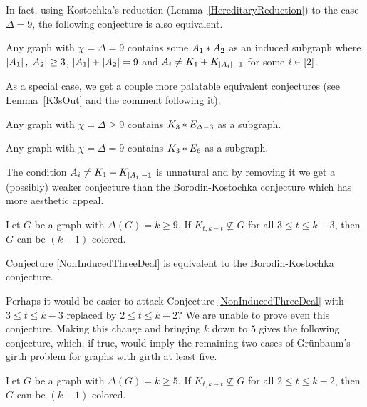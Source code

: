In fact, using Kostochka's reduction (Lemma~\ref{HereditaryReduction}) to the
case $\Delta = 9$, the following conjecture is also equivalent.

\begin{conjecture}
Any graph with $\chi = \Delta = 9$ contains some $A_1 \mbox{\hspace{2 pt}$\ast$\hspace{2 pt}} A_2$ as an induced
subgraph where $\left|A_1\right|, \left|A_2\right| \geq 3$, $\left|A_1\right| + \left|A_2\right| = 9$
and $A_i \neq K_1 \mbox{\hspace{2 pt}$+$\hspace{2 pt}} K_{\left|A_i\right| - 1}$ for some $i \in \left[2\right]$.
\end{conjecture}

As a special case, we get a couple more palatable equivalent conjectures (see
Lemma~\ref{K3sOut} and the comment following it).

\begin{conjecture}\label{K3Conjecture}
Any graph with $\chi = \Delta \geq 9$ contains $K_3 \mbox{\hspace{2 pt}$\ast$\hspace{2 pt}} E_{\Delta-3}$ as a
subgraph.
\end{conjecture}

\begin{conjecture}\label{K3ConjectureReduced}
Any graph with $\chi = \Delta = 9$ contains $K_3 \mbox{\hspace{2 pt}$\ast$\hspace{2 pt}} E_6$ as a
subgraph.
\end{conjecture}

The condition $A_i \neq K_1 \mbox{\hspace{2 pt}$+$\hspace{2 pt}} K_{\left|A_i\right| - 1}$ is unnatural and
by removing it we get a (possibly) weaker conjecture than the
Borodin-Kostochka conjecture which has more aesthetic appeal.

\begin{conjecture}\label{NonInducedThreeDeal}
Let $G$ be a graph with $\Delta(G) = k \geq 9$. If $K_{t, k - t} \not \subseteq G$ for all $3 \leq t \leq k - 3$, then $G$ can be $(k - 1)$-colored.
\end{conjecture}

\begin{conjecture}
Conjecture \ref{NonInducedThreeDeal} is equivalent to the Borodin-Kostochka
conjecture.
\end{conjecture}

Perhaps it would be easier to attack Conjecture \ref{NonInducedThreeDeal} with
$3 \leq t \leq k - 3$ replaced by $2 \leq t \leq k - 2$?  We are unable to
prove even this conjecture. Making this change and bringing $k$ down to $5$
gives the following conjecture, which, if true, would imply the remaining two cases of Gr\"unbaum's girth problem for graphs with girth at least five.

\begin{conjecture}\label{NonInducedTwoDeal}
Let $G$ be a graph with $\Delta(G) = k \geq 5$. If $K_{t, k - t} \not \subseteq
G$ for all $2 \leq t \leq k - 2$, then $G$ can be $(k - 1)$-colored.
\end{conjecture}

